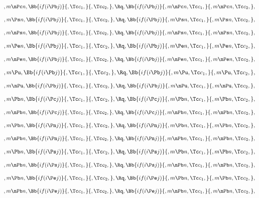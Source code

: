 \[,m \nPc n, \Bb{if(i \Pb j)}{,\Tc c_1,}{,\Tc c_2,}, \Rq , \Bb{if(i \Pb j)}{,m \nPc n,\Tc c_1,}{,m \nPc n,\Tc c_2,},\]
\bigskip
\bigskip

\[,m \Ps n, \Bb{if(i \Pb j)}{,\Tc c_1,}{,\Tc c_2,}, \Rq , \Bb{if(i \Pb j)}{,m \Ps n,\Tc c_1,}{,m \Ps n,\Tc c_2,},\]
\bigskip
\bigskip

\[,m \nPs n, \Bb{if(i \Pb j)}{,\Tc c_1,}{,\Tc c_2,}, \Rq , \Bb{if(i \Pb j)}{,m \nPs n,\Tc c_1,}{,m \nPs n,\Tc c_2,},\]
\bigskip
\bigskip

\[,m \Pe n, \Bb{if(i \Pb j)}{,\Tc c_1,}{,\Tc c_2,}, \Rq , \Bb{if(i \Pb j)}{,m \Pe n,\Tc c_1,}{,m \Pe n,\Tc c_2,},\]
\bigskip
\bigskip

\[,m \nPe n, \Bb{if(i \Pb j)}{,\Tc c_1,}{,\Tc c_2,}, \Rq , \Bb{if(i \Pb j)}{,m \nPe n,\Tc c_1,}{,m \nPe n,\Tc c_2,},\]
\bigskip
\bigskip

\[,m \Pu, \Bb{if(i \Pb j)}{,\Tc c_1,}{,\Tc c_2,}, \Rq , \Bb{if(i \Pb j)}{,m \Pu,\Tc c_1,}{,m \Pu,\Tc c_2,},\]
\bigskip
\bigskip

\[,m \nPu, \Bb{if(i \Pb j)}{,\Tc c_1,}{,\Tc c_2,}, \Rq , \Bb{if(i \Pb j)}{,m \nPu,\Tc c_1,}{,m \nPu,\Tc c_2,},\]
\bigskip
\bigskip


\[,m \Pb n, \Bb{if(i \Pc j)}{,\Tc c_1,}{,\Tc c_2,}, \Rq , \Bb{if(i \Pc j)}{,m \Pb n,\Tc c_1,}{,m \Pb n,\Tc c_2,},\]
\bigskip
\bigskip

\[,m \nPb n, \Bb{if(i \Pc j)}{,\Tc c_1,}{,\Tc c_2,}, \Rq , \Bb{if(i \Pc j)}{,m \nPb n,\Tc c_1,}{,m \nPb n,\Tc c_2,},\]
\bigskip
\bigskip

\[,m \Pb n, \Bb{if(i \Pn j)}{,\Tc c_1,}{,\Tc c_2,}, \Rq , \Bb{if(i \Pn j)}{,m \Pb n,\Tc c_1,}{,m \Pb n,\Tc c_2,},\]
\bigskip
\bigskip

\[,m \nPb n, \Bb{if(i \Pn j)}{,\Tc c_1,}{,\Tc c_2,}, \Rq , \Bb{if(i \Pn j)}{,m \nPb n,\Tc c_1,}{,m \nPb n,\Tc c_2,},\]
\bigskip
\bigskip

\[,m \Pb n, \Bb{if(i \Ps j)}{,\Tc c_1,}{,\Tc c_2,}, \Rq , \Bb{if(i \Ps j)}{,m \Pb n,\Tc c_1,}{,m \Pb n,\Tc c_2,},\]
\bigskip
\bigskip

\[,m \nPb n, \Bb{if(i \Ps j)}{,\Tc c_1,}{,\Tc c_2,}, \Rq , \Bb{if(i \Ps j)}{,m \nPb n,\Tc c_1,}{,m \nPb n,\Tc c_2,},\]
\bigskip
\bigskip

\[,m \Pb n, \Bb{if(i \Pe j)}{,\Tc c_1,}{,\Tc c_2,}, \Rq , \Bb{if(i \Pe j)}{,m \Pb n,\Tc c_1,}{,m \Pb n,\Tc c_2,},\]
\bigskip
\bigskip

\[,m \nPb n, \Bb{if(i \Pe j)}{,\Tc c_1,}{,\Tc c_2,}, \Rq , \Bb{if(i \Pe j)}{,m \nPb n,\Tc c_1,}{,m \nPb n,\Tc c_2,},\]
\bigskip
\bigskip

